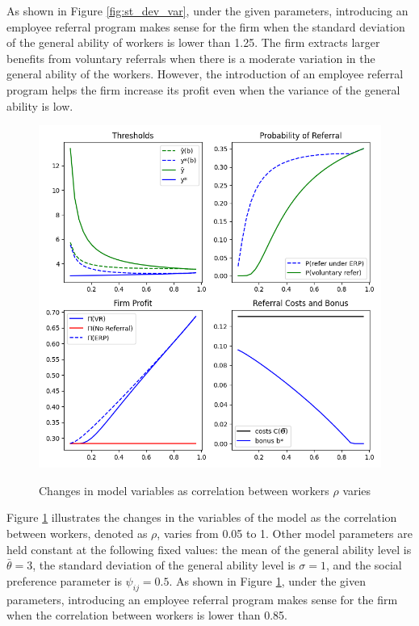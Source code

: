 \documentclass[12pt]{article}
\begin{document}
As shown in Figure \ref{fig:st_dev_var}, under the given parameters, introducing an employee referral program makes sense for the firm when the standard deviation of the general  ability of workers is lower than 1.25. The firm extracts larger benefits from voluntary referrals when there is a moderate variation in the general ability of the workers. However, the introduction of an employee referral program helps the firm increase its profit even when the variance of the general ability is low.

\begin{figure}[ht]
    \caption{Changes in model variables as correlation between workers $\rho$ varies}
    \includegraphics[width=12cm]{images/imperf_rho_var.png}
    \centering
    \label{fig:rho_var}
\end{figure}

Figure \ref{fig:rho_var} illustrates the changes in the  variables of the model as the correlation between workers, denoted as $\rho$, varies from 0.05 to 1. Other model parameters are held constant at the following fixed values: the mean of the general ability level is $\bar{\theta} = 3$, the standard deviation of the general ability level is $\sigma = 1$, and the social preference parameter is $\psi_{ij} = 0.5$. As shown in Figure \ref{fig:rho_var}, under the given parameters, introducing an employee referral program makes sense for the firm when the correlation between workers is lower than 0.85.
\end{document}
